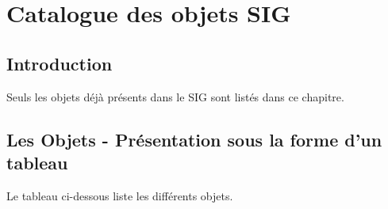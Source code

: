 \documentclass[12pt,titlepage]{book}
\begin{document}
\chapter{Catalogue des objets SIG}

\section{Introduction}
Seuls les objets déjà présents dans le SIG sont listés dans ce chapitre.


\section{Les Objets - Présentation sous la forme d'un tableau}
Le tableau ci-dessous liste les différents objets.
\vspace{\baselineskip}
\end{document}
